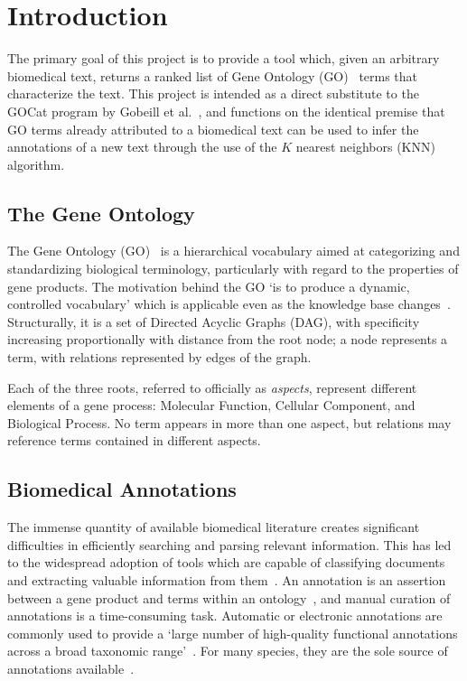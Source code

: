 \documentclass[11pt]{article}
\theoremstyle{plain}
\theoremstyle{definition}
\begin{document}
\section{Introduction}\label{sec:introduction}

The primary goal of this project is to provide a tool which, given an arbitrary biomedical text, returns a ranked list of Gene Ontology (GO)~\cite{ashburner/2000/gene,consortium/2025/gene} terms that characterize the text. This project is intended as a direct substitute to the GOCat program by Gobeill et al.\ \cite{gobeill/2013/managing}, and functions on the identical premise that GO terms already attributed to a biomedical text can be used to infer the annotations of a new text through the use of the $K$ nearest neighbors (KNN) algorithm.

\subsection{The Gene Ontology}\label{sec:introduction-ontology}

The Gene Ontology (GO)~\cite{consortium/2025/gene} is a hierarchical vocabulary aimed at categorizing and standardizing biological terminology, particularly with regard to the properties of gene products. The motivation behind the GO `is to produce a dynamic, controlled vocabulary' which is applicable even as the knowledge base changes~\cite{ashburner/2000/gene}. Structurally, it is a set of Directed Acyclic Graphs (DAG), with specificity increasing proportionally with distance from the root node; a node represents a term, with relations represented by edges of the graph.

Each of the three roots, referred to officially as \textit{aspects}, represent different elements of a gene process: Molecular Function, Cellular Component, and Biological Process. No term appears in more than one aspect, but relations may reference terms contained in different aspects.

\subsection{Biomedical Annotations}\label{sec:introduction-annotations}

The immense quantity of available biomedical literature creates significant difficulties in efficiently searching and parsing relevant information. This has led to the widespread adoption of tools which are capable of classifying documents and extracting valuable information from them~\cite{hunter/2006/biomedical}.  An annotation is an assertion between a gene product and terms within an ontology~\cite{hill/2008/gene}, and manual curation of annotations is a time-consuming task. Automatic or electronic annotations are commonly used to provide a `large number of high-quality functional annotations across a broad taxonomic range'~\cite{huntley/2014/database}. For many species, they are the sole source of annotations available~\cite{huntley/2014/database}.
\end{document}
